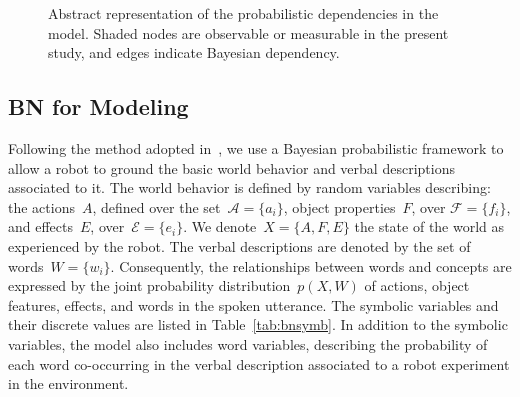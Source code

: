 \begin{figure*}
\begin{minipage}{0.5\textwidth}
  \end{minipage}
  \caption{Abstract representation of the probabilistic dependencies in the model. Shaded nodes are observable or measurable in the present study, and edges indicate Bayesian dependency.}
  \label{fig:model}
\end{figure*}

\subsection{\acl{BN} for \AffWords{} Modeling}
\label{sec:bn}

Following the method adopted in~\cite{salvi:2012:smcb}, we use a Bayesian probabilistic framework to allow a robot to ground the basic world behavior and verbal descriptions associated to it. The world behavior is defined by random variables describing: the actions~$A$, defined over the set~$\mathcal{A} = \{a_i\}$, object properties~$F$, over $\mathcal{F} = \{f_i\}$, and effects~$E$, over~$\mathcal{E} = \{e_i\}$. We denote~$X = \{A, F, E\}$ the state of the world as experienced by the robot. The verbal descriptions are denoted by the set of words~$W = \{w_i\}$. Consequently, the relationships between words and concepts are expressed by the joint probability distribution~$p(X,W)$ of actions, object features, effects, and words in the spoken utterance. The symbolic variables and their discrete values are listed in Table~\ref{tab:bnsymb}. In addition to the symbolic variables, the model also includes word variables, describing the probability of each word co-occurring in the verbal description associated to a robot experiment in the environment.

